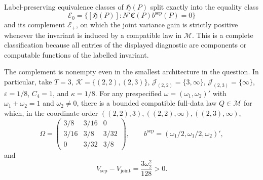 Label-preserving equivalence classes of \(\mathfrak H(P)\) split exactly into the equality class
\[
 \mathscr E_0=\{[\mathfrak H(P)]:N'\mathfrak C(P)b^{\mathrm{sep}}(P)=0\}
\]
and its complement \(\mathscr E_+\), on which the joint variance gain is strictly positive whenever the invariant is induced by a compatible law in \(\mathcal M\).  This is a complete classification because all entries of the displayed diagnostic are components or computable functions of the labelled invariant.

The complement is nonempty even in the smallest architecture in the question.  In particular, take \(T=3\), \(\mathcal K=\{(2,2),(2,3)\}\), \(\mathcal J_{(2,2)}=\{3,\infty\}\), \(\mathcal J_{(2,3)}=\{\infty\}\), \(\varepsilon=1/8\), \(C_4=1\), and \(\kappa=1/8\).  For any prespecified \(\omega=(\omega_1,\omega_2)'\) with \(\omega_1+\omega_2=1\) and \(\omega_2\ne0\), there is a bounded compatible full-data law \(Q\in\mathcal M\) for which, in the coordinate order \(((2,2),3),((2,2),\infty),((2,3),\infty)\),
\[
 \Omega=
 \begin{pmatrix}
 3/8&3/16&0\\
 3/16&3/8&3/32\\
 0&3/32&3/8
 \end{pmatrix},
 \qquad
 b^{\mathrm{sep}}=(\omega_1/2,\omega_1/2,\omega_2)',
\]
and
\[
 V_{\mathrm{sep}}-V_{\mathrm{joint}}=\frac{3\omega_2^2}{128}>0.
\]
